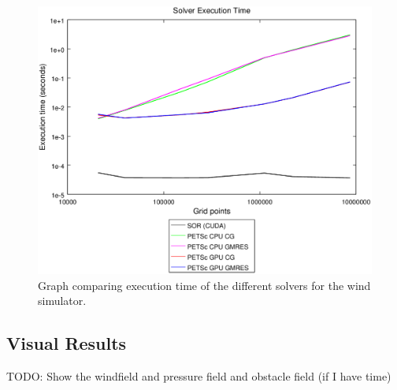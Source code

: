 \begin{figure}[ht]
	\center
	\includegraphics[width=1.0\textwidth]{results/data/sb/exec_time_all}
	\caption{Graph comparing execution time of the different solvers for the
		wind simulator.}
	\label{fig:sb_exec_time_all}
\end{figure}

\subsection{Visual Results}

TODO: Show the windfield and pressure field and obstacle field (if I have time)
